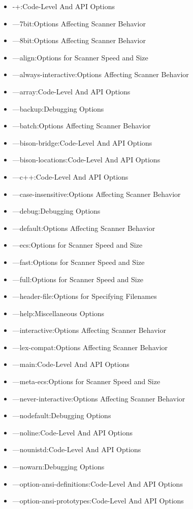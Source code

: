 \documentclass[openany,oneside]{book}
\begin{document}
\begin{itemize}
\item -+:Code-Level And API Options
\item —7bit:Options Affecting Scanner Behavior
\item —8bit:Options Affecting Scanner Behavior
\item —align:Options for Scanner Speed and Size
\item —always-interactive:Options Affecting Scanner Behavior
\item —array:Code-Level And API Options
\item —backup:Debugging Options
\item —batch:Options Affecting Scanner Behavior
\item —bison-bridge:Code-Level And API Options
\item —bison-locations:Code-Level And API Options
\item —c++:Code-Level And API Options
\item —case-insensitive:Options Affecting Scanner Behavior
\item —debug:Debugging Options
\item —default:Options Affecting Scanner Behavior
\item —ecs:Options for Scanner Speed and Size
\item —fast:Options for Scanner Speed and Size
\item —full:Options for Scanner Speed and Size
\item —header-file:Options for Specifying Filenames
\item —help:Miscellaneous Options
\item —interactive:Options Affecting Scanner Behavior
\item —lex-compat:Options Affecting Scanner Behavior
\item —main:Code-Level And API Options
\item —meta-ecs:Options for Scanner Speed and Size
\item —never-interactive:Options Affecting Scanner Behavior
\item —nodefault:Debugging Options
\item —noline:Code-Level And API Options
\item —nounistd:Code-Level And API Options
\item —nowarn:Debugging Options
\item —option-ansi-definitions:Code-Level And API Options
\item —option-ansi-prototypes:Code-Level And API Options

\end{itemize}
\end{document}
